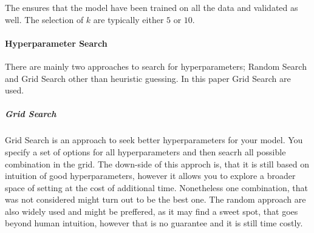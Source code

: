 The ensures that the model have been trained on all the data and validated as well. The selection of $k$ are typically either $5$ or $10$. 

\paragraph{Hyperparameter Search}

There are mainly two approaches to search for hyperparameters; Random Search and Grid Search other than heuristic guessing. In this paper Grid Search are used.

\subparagraph{Grid Search}

Grid Search is an approach to seek better hyperparameters for your model. You specify a set of options for all hyperparameters and then seacrh all possible combination in the grid. The down-side of this approch is, that it is still based on intuition of good hyperparameters, however it allows you to explore a broader space of setting at the cost of additional time. Nonetheless one combination, that was not considered might turn out to be the best one. The random approach are also widely used and might be preffered, as it may find a sweet spot, that goes beyond human intuition, however that is no guarantee and it is still time costly.  